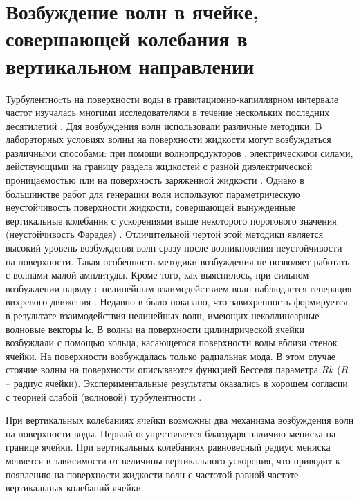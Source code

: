 \section{Возбуждение волн в ячейке, совершающей колебания в вертикальном направлении} \label{p1_methodsExt}
Турбулентноcть на поверхности воды в гравитационно-капиллярном интервале частот изучалась многими исследователями в течение нескольких последних десятилетий \cite{Falcon2007, Henry2000, Shats2010, Denissenko2007}. Для возбуждения волн использовали различные методики. В лабораторных условиях волны на поверхности жидкости могут возбуждаться различными способами: при помощи волнопродукторов \cite{Havelock1929, Falcon2007}, электрическими силами, действующими на границу раздела жидкостей с разной диэлектрической проницаемостью \cite{Kalinichenko1982} или на поверхность заряженной жидкости \cite{Brazhnikov2002}. Однако в большинстве работ для генерации волн используют параметрическую неустойчивость поверхности жидкости, совершающей вынужденные вертикальные колебания с ускорениями выше некоторого порогового значения (неустойчивость Фарадея) \cite{Henry2000, Shats2010, Denissenko2007}. Отличительной чертой этой методики является высокий уровень возбуждения волн сразу после возникновения неустойчивости на поверхности. Такая особенность методики возбуждения не позволяет работать с волнами малой амплитуды. Кроме того, как выяснилось, при сильном возбуждении наряду с нелинейным взаимодействием волн наблюдается генерация вихревого движения \cite{VonKameke2011, Francois2013}. Недавно в \cite{F5, F6} было показано, что завихренность формируется в результате взаимодействия нелинейных волн, имеющих неколлинеарные волновые векторы $\mathbf{k}$. В \cite{BrazhnikovWater} волны на поверхности цилиндрической ячейки возбуждали с помощью кольца, касающегося поверхности воды вблизи стенок ячейки. На поверхности возбуждалась только радиальная мода. В этом случае стоячие волны на поверхности описываются функцией Бесселя параметра $Rk$ ($R$ – радиус ячейки). Экспериментальные результаты \cite{BrazhnikovWater} оказались в хорошем согласии с теорией слабой (волновой) турбулентности \cite{Zakharov}.


При вертикальных колебаниях ячейки возможны два механизма возбуждения волн на поверхности воды. Первый осуществляется благодаря наличию мениска на границе ячейки. При вертикальных колебаниях равновесный радиус мениска меняется в зависимости от величины вертикального ускорения, что приводит к появлению на поверхности жидкости волн с частотой равной частоте вертикальных колебаний ячейки. 

